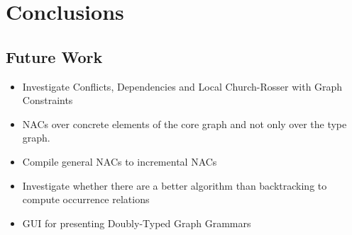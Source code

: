 \chapter{Conclusions}\label{ch:conclusions}

\section{Future Work}

\begin{itemize}
  \item Investigate Conflicts, Dependencies and Local Church-Rosser with Graph Constraints
  \item NACs over concrete elements of the core graph and not only over the type graph. 
  \item Compile general NACs to incremental NACs
  \item Investigate whether there are a better algorithm than backtracking to compute occurrence relations
  \item GUI for presenting Doubly-Typed Graph Grammars
\end{itemize}
